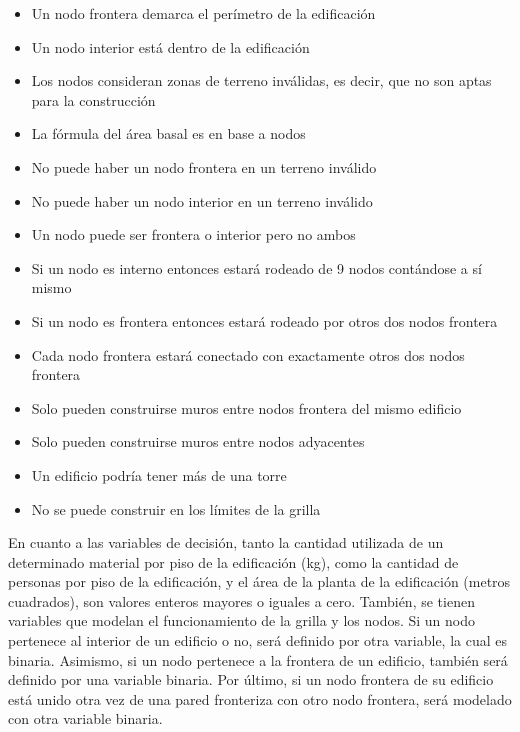 \documentclass[letterpaper]{article}
\begin{document}
\begin{itemize}
	\setlength\itemsep{0.0003em}
	\item Un nodo frontera demarca el perímetro de la edificación
	\item Un nodo interior está dentro de la edificación
	\item Los nodos consideran zonas de terreno inválidas, es decir, que no son aptas para la construcción
	\item La fórmula del área basal es en base a nodos
	\item No puede haber un nodo frontera en un terreno inválido
	\item No puede haber un nodo interior en un terreno inválido
	\item Un nodo puede ser frontera o interior pero no ambos
	\item Si un nodo es interno entonces estará rodeado de 9 nodos contándose a sí mismo
	\item Si un nodo es frontera entonces estará rodeado por otros dos nodos frontera
	\item Cada nodo frontera estará conectado con exactamente otros dos nodos frontera
	\item Solo pueden construirse muros entre nodos frontera del mismo edificio
	\item Solo pueden construirse muros entre nodos adyacentes
	\item Un edificio podría tener más de una torre
	\item No se puede construir en los límites de la grilla
\end{itemize} 
En cuanto a las variables de decisión, tanto la cantidad utilizada de un determinado material por piso de la edificación (kg), como la cantidad de personas por piso de la edificación, y el
área de la planta de la edificación (metros cuadrados), son valores enteros mayores o iguales a cero. También, se tienen variables que modelan el funcionamiento de la grilla y los nodos. Si un nodo pertenece
al interior de un edificio o no, será definido por otra variable, la cual es binaria. Asimismo, si un nodo pertenece
a la frontera de un edificio, también será definido por una variable binaria. Por último, si un nodo frontera de su edificio está unido otra
vez de una pared fronteriza con otro nodo frontera, será modelado con otra variable binaria.
\end{document}
